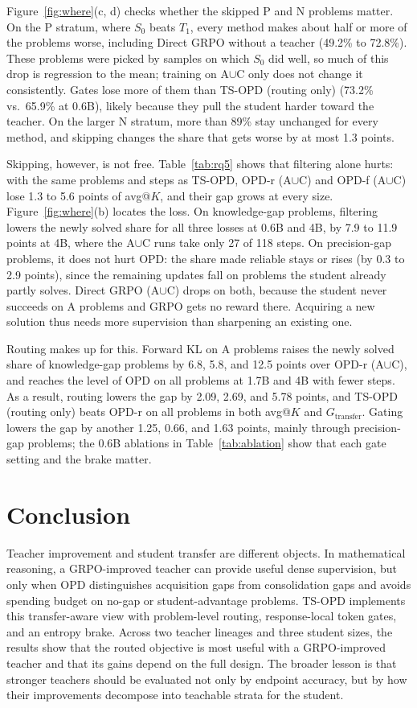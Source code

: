 \documentclass[10pt]{article}
\makeatletter
\newcommand{\avgk}{avg@$K$}
\newcommand{\tsopd}{TS-OPD}
\newcommand{\tsro}{TS-OPD (routing only)}
\newcommand{\AC}{A$\cup$C}
\newcommand{\Gt}{G_{\mathrm{transfer}}}
\makeatother
\begin{document}
Figure~\ref{fig:where}(c, d) checks whether the skipped P and N problems matter. On
the P stratum,
where $S_0$ beats $T_1$, every method makes about half or more of the problems
worse, including Direct GRPO without a teacher (49.2\% to 72.8\%). These
problems were picked by samples on which $S_0$ did well, so much of this drop is
regression to the mean; training on \AC{} only does not change it consistently. Gates lose more of them than \tsro{} (73.2\% vs.\ 65.9\% at
0.6B), likely because they pull the student harder toward the teacher. On the larger N stratum, more than 89\% stay unchanged for every
method, and skipping changes the share that gets worse by at most 1.3 points.

Skipping, however, is not free. Table~\ref{tab:rq5} shows that filtering alone
hurts: with the same problems and steps as \tsopd{}, OPD-r (\AC) and OPD-f
(\AC) lose 1.3 to 5.6 points of \avgk{}, and their gap grows at every size.
Figure~\ref{fig:where}(b) locates the loss. On knowledge-gap problems, filtering
lowers the newly solved share for all three losses at 0.6B and 4B, by 7.9 to
11.9 points at 4B, where the \AC{} runs take only 27 of 118 steps. On
precision-gap problems, it does not hurt OPD: the share made reliable stays or
rises (by 0.3 to 2.9 points), since the remaining updates fall on problems the
student already partly solves. Direct GRPO (\AC) drops on both, because the student
never succeeds on A problems and GRPO gets no reward there. Acquiring a new
solution thus needs more supervision than sharpening an existing one.

Routing makes up for this. Forward KL on A problems raises the newly solved share
of knowledge-gap problems by 6.8, 5.8, and 12.5 points over OPD-r (\AC), and
reaches the level of OPD on all problems at 1.7B and 4B with fewer steps. As a
result, routing lowers the gap by 2.09, 2.69, and 5.78 points, and \tsro{} beats
OPD-r on all problems in both \avgk{} and $\Gt$. Gating lowers the gap by another
1.25, 0.66, and 1.63 points, mainly through precision-gap problems; the 0.6B
ablations in Table~\ref{tab:ablation} show that each gate setting and the brake
matter.

\section{Conclusion}

Teacher improvement and student transfer are different objects. In mathematical
reasoning, a GRPO-improved teacher can provide useful dense supervision, but
only when OPD distinguishes acquisition gaps from consolidation gaps and avoids
spending budget on no-gap or student-advantage problems. \tsopd{} implements
this transfer-aware view with problem-level routing, response-local token
gates, and an entropy brake. Across two teacher lineages and three student
sizes, the results show that the routed objective is most useful with a
GRPO-improved teacher and that its gains depend on the full design. The broader
lesson is that stronger teachers should be evaluated not only by endpoint
accuracy, but by how their improvements decompose into teachable strata for the
student.
\end{document}
